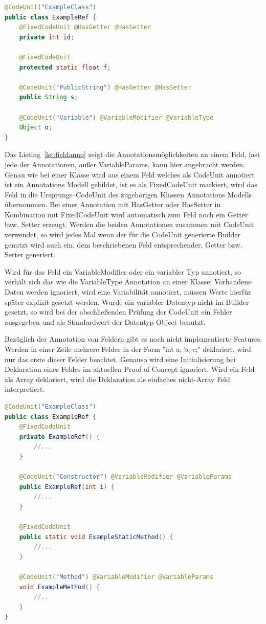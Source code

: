 \documentclass[12pt,oneside,a4paper,parskip]{scrbook}
\begin{document}
\begin{lstlisting}[label=lst:fieldanno,
language=java,
firstnumber=1,
caption=Darstellung der Annotationsmöglichkeiten an einer Klasse.]
@CodeUnit("ExampleClass")
public class ExampleRef {
	@FixedCodeUnit @HasGetter @HasSetter
	private int id;

	@FixedCodeUnit
	protected static float f;

	@CodeUnit("PublicString") @HasGetter @HasSetter
	public String s;

	@CodeUnit("Variable") @VariableModifier @VariableType
	Object o;
}
\end{lstlisting}

Das Listing~\ref{lst:fieldanno} zeigt die Annotationsmöglichkeiten an einem Feld, fast jede der Annotationen, außer VariableParams, kann hier angebracht werden. Genau wie bei einer Klasse wird aus einem Feld welches als CodeUnit annotiert ist ein Annotations Modell gebildet, ist es als FixedCodeUnit markiert, wird das Feld in die Ursprungs--CodeUnit des zugehörigen Klassen Annotations Modells übernommen. Bei einer Annotation mit HasGetter oder HasSetter in Kombination mit FixedCodeUnit wird automatisch zum Feld noch ein Getter bzw. Setter erzeugt. Werden die beiden Annotationen zusammen mit CodeUnit verwendet, so wird jedes Mal wenn der für die CodeUnit generierte Builder genutzt wird auch ein, dem beschriebenen Feld entsprechender, Getter bzw. Setter generiert. 

Wird für das Feld ein VariableModifier oder ein variabler Typ annotiert, so verhält sich das wie die VariableType Annotation an einer Klasse: Vorhandene Daten werden ignoriert, wird eine Variabilität annotiert, müssen Werte hierfür später explizit gesetzt werden. Wurde ein variabler Datentyp nicht im Builder gesetzt, so wird bei der abschließenden Prüfung der CodeUnit ein Fehler ausgegeben und als Standardwert der Datentyp Object benutzt.

Bezüglich der Annotation von Feldern gibt es noch nicht implementierte Features. Werden in einer Zeile mehrere Felder in der Form "int a, b, c;" deklariert, wird nur das erste dieser Felder beachtet. Genauso wird eine Initialisierung bei Deklaration eines Feldes im aktuellen Proof of Concept ignoriert. Wird ein Feld als Array deklariert, wird die Deklaration als einfaches nicht-Array Feld interpretiert.

\begin{lstlisting}[label=lst:constrmethoanno,
language=java,
firstnumber=1,
caption=Darstellung der Annotationsmöglichkeiten von Konstruktoren und Methoden.]
@CodeUnit("ExampleClass")
public class ExampleRef {
	@FixedCodeUnit
	private ExampleRef() {
		//...
	}
	
	@CodeUnit("Constructor") @VariableModifier @VariableParams
	public ExampleRef(int i) {
		//...
	}
	
	@FixedCodeUnit
	public static void ExampleStaticMethod() {
		//...
	}
	
	@CodeUnit("Method") @VariableModifier @VariableParams
	void ExampleMethod() {
		//..
	}
}
\end{lstlisting}
\end{document}
